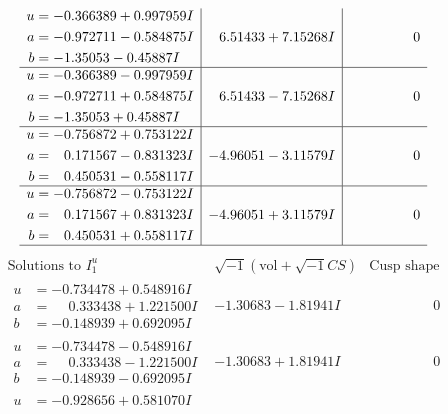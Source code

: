 \documentclass[1p]{elsarticle_modified}
\theoremstyle{definition}
\newcommand{\I}{\sqrt{-1}}
\begin{document}
$$\begin{array}{c|c|c}
\begin{aligned}
u &= -0.366389 + 0.997959 I \\
a &= -0.972711 - 0.584875 I \\
b &= -1.35053 - 0.45887 I\end{aligned}
 & \phantom{-}6.51433 + 7.15268 I & \phantom{-0.000000 } 0 \\ \hline\begin{aligned}
u &= -0.366389 - 0.997959 I \\
a &= -0.972711 + 0.584875 I \\
b &= -1.35053 + 0.45887 I\end{aligned}
 & \phantom{-}6.51433 - 7.15268 I & \phantom{-0.000000 } 0 \\ \hline\begin{aligned}
u &= -0.756872 + 0.753122 I \\
a &= \phantom{-}0.171567 - 0.831323 I \\
b &= \phantom{-}0.450531 - 0.558117 I\end{aligned}
 & -4.96051 - 3.11579 I & \phantom{-0.000000 } 0 \\ \hline\begin{aligned}
u &= -0.756872 - 0.753122 I \\
a &= \phantom{-}0.171567 + 0.831323 I \\
b &= \phantom{-}0.450531 + 0.558117 I\end{aligned}
 & -4.96051 + 3.11579 I & \phantom{-0.000000 } 0\\
 \hline 
 \end{array}$$\newpage$$\begin{array}{c|c|c}  
\text{Solutions to }I^u_{1}& \I (\text{vol} + \sqrt{-1}CS) & \text{Cusp shape}\\
 \hline 
\begin{aligned}
u &= -0.734478 + 0.548916 I \\
a &= \phantom{-}0.333438 + 1.221500 I \\
b &= -0.148939 + 0.692095 I\end{aligned}
 & -1.30683 - 1.81941 I & \phantom{-0.000000 } 0 \\ \hline\begin{aligned}
u &= -0.734478 - 0.548916 I \\
a &= \phantom{-}0.333438 - 1.221500 I \\
b &= -0.148939 - 0.692095 I\end{aligned}
 & -1.30683 + 1.81941 I & \phantom{-0.000000 } 0 \\ \hline\begin{aligned}
u &= -0.928656 + 0.581070 I \\

\end{aligned}
\end{array}$$
\end{document}
